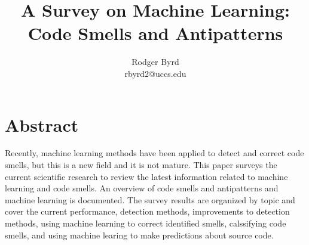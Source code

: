 \documentclass[conference]{IEEEtran}
\begin{document}

\title{A Survey on Machine Learning: Code Smells and Antipatterns}
\author{Rodger Byrd\\rbyrd2@uccs.edu}

\maketitle

\section{Abstract}
Recently, machine learning methods have been applied to detect and correct code smells, but this is a new field and it is not mature. This paper surveys the current scientific research to review the latest information related to machine learning and code smells. An overview of code smells and antipatterns and machine learning is documented. The survey results are organized by topic and cover the current performance, detection methods, improvements to detection methods, using machine learning to correct identified smells, calssifying code smells, and using machine learing to make predictions about source code. 
\end{document}
